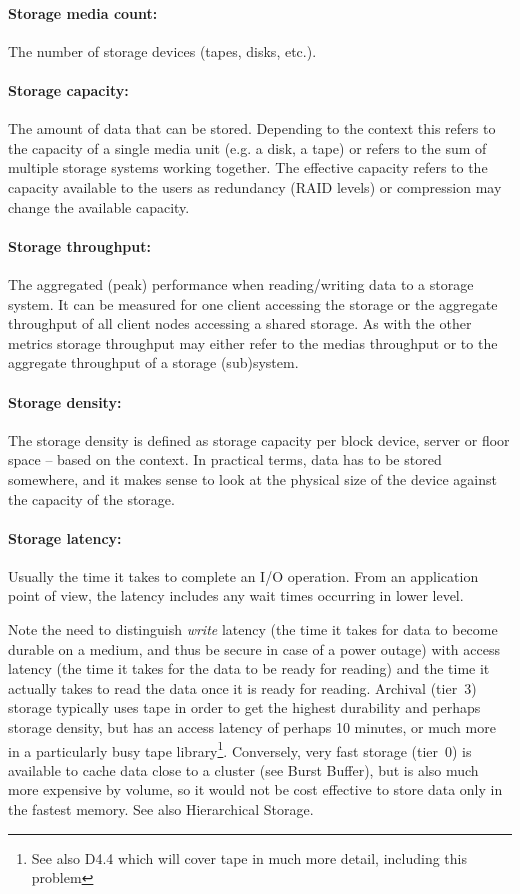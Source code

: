 \paragraph{Storage media count:}
The number of storage devices (tapes, disks, etc.).


\paragraph{Storage capacity:} The amount of data that can be stored.
Depending to the context this refers to the capacity of a single media unit (e.g. a disk, a tape) or refers to the sum of multiple storage systems working together.
The effective capacity refers to the capacity available to the users as redundancy (RAID levels) or compression may change the available capacity.


\paragraph{Storage throughput:}
The aggregated (peak) performance when reading/writing data to a storage system.
It can be measured for one client accessing the storage or the aggregate throughput of all client nodes accessing a shared storage.
As with the other metrics storage throughput may either refer to the medias throughput or to the aggregate throughput of a storage (sub)system.

\paragraph{Storage density:}
The storage density is defined as storage capacity per block device, server or floor space -- based on the context.
In practical terms, data has to be stored somewhere, and it makes sense to look at the physical size of the device against the capacity of the storage.

\paragraph{Storage latency:} Usually the time it takes to complete an I/O operation. From an application point of view, the latency includes any wait times occurring in lower level.

Note the need to distinguish \emph{write} latency (the time it takes for data to become durable on a medium, and thus be secure in case of a power outage) with access latency (the time it takes for the data to be ready for reading) and the time it actually takes to read the data once it is ready for reading.  Archival (tier~3) storage typically uses tape in order to get the highest durability and perhaps storage density, but has an access latency of perhaps 10 minutes, or much more in a particularly busy tape library\footnote{See also D4.4 which will cover tape in much more detail, including this problem}.  Conversely, very fast storage (tier~0) is available to cache data close to a cluster (see Burst Buffer), but is also much more expensive by volume, so it would not be cost effective to store data only in the fastest memory.  See also Hierarchical Storage.


